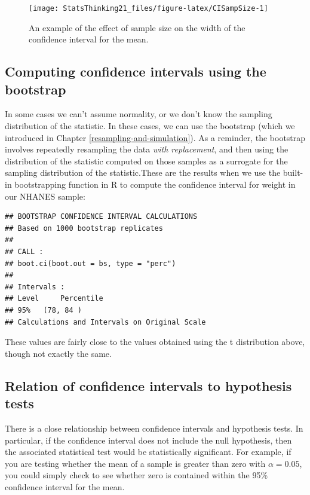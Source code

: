 \documentclass[12pt,]{book}
\theoremstyle{definition}
\theoremstyle{definition}
\theoremstyle{definition}
\theoremstyle{remark}
\begin{document}
\begin{figure}
\texttt{[image: StatsThinking21\_files/figure-latex/CISampSize-1]} \caption{An example of the effect of sample size on the width of the confidence interval for the mean.}\label{fig:CISampSize}
\end{figure}

\hypertarget{computing-confidence-intervals-using-the-bootstrap}{%
\subsection{Computing confidence intervals using the bootstrap}\label{computing-confidence-intervals-using-the-bootstrap}}

In some cases we can't assume normality, or we don't know the sampling distribution of the statistic. In these cases, we can use the bootstrap (which we introduced in Chapter \ref{resampling-and-simulation}). As a reminder, the bootstrap involves repeatedly resampling the data \emph{with replacement}, and then using the distribution of the statistic computed on those samples as a surrogate for the sampling distribution of the statistic.These are the results when we use the built-in bootstrapping function in R to compute the confidence interval for weight in our NHANES sample:

\begin{verbatim}
## BOOTSTRAP CONFIDENCE INTERVAL CALCULATIONS
## Based on 1000 bootstrap replicates
## 
## CALL : 
## boot.ci(boot.out = bs, type = "perc")
## 
## Intervals : 
## Level     Percentile     
## 95%   (78, 84 )  
## Calculations and Intervals on Original Scale
\end{verbatim}

These values are fairly close to the values obtained using the t distribution above, though not exactly the same.

\hypertarget{relation-of-confidence-intervals-to-hypothesis-tests}{%
\subsection{Relation of confidence intervals to hypothesis tests}\label{relation-of-confidence-intervals-to-hypothesis-tests}}

There is a close relationship between confidence intervals and hypothesis tests. In particular, if the confidence interval does not include the null hypothesis, then the associated statistical test would be statistically significant. For example, if you are testing whether the mean of a sample is greater than zero with \(\alpha = 0.05\), you could simply check to see whether zero is contained within the 95\% confidence interval for the mean.
\end{document}
